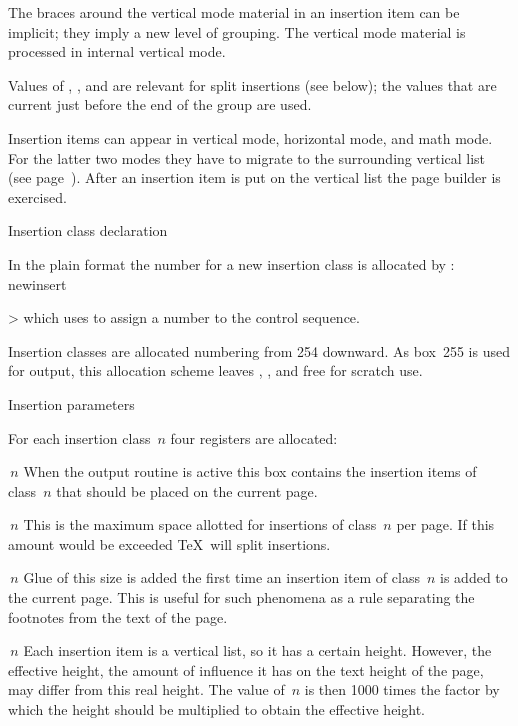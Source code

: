 The braces around the vertical mode material in an insertion
item can be implicit; they imply a new level of grouping.
The vertical mode material is processed in internal
vertical mode.

Values of , , 
and  are relevant for split insertions
(see below); the values that are current just before
the end of the group are used.

Insertion items can appear in vertical mode, horizontal
mode, and math mode. For the latter two modes they have to
migrate to the surrounding vertical list
(see page~\pgref[migrate]).
After an insertion item is put on  the vertical list the
page builder is exercised.


\point Insertion class declaration

In the plain format 
the  number for a new insertion class
is allocated by :
\csterm newinsert\par
\Ver>\newinsert\myinsert %
which uses  to assign a number to the control
sequence.

Insertion classes are allocated numbering from 254 downward.
As box~255 is used for output, this allocation scheme leaves
, , and 
free for scratch use.

\point Insertion parameters

For each insertion class~$n$ four registers are allocated:
\itemlist
\item {}$\,n$ When the output routine is active this
 box contains the insertion items of class~$n$ that should
 be placed on the current page.
\item {}$\,n$ This is the maximum space allotted for
 insertions of class~$n$ per page. If this amount would
 be exceeded \TeX\ will split insertions.
\item {}$\,n$ Glue of this size is added the first
 time an insertion item of class~$n$ is added to the
 current page. This is useful for such phenomena as a rule
 separating the footnotes from the text of the page.
\item {}$\,n$ Each insertion item is a vertical list,
 so it has a certain height. However, the effective height,
 the amount of influence it has on the text height of the
 page, may differ from this real height.
 The value of $\,n$
 is then 1000 times the factor by which the height should
 be multiplied to obtain the effective height.
 
